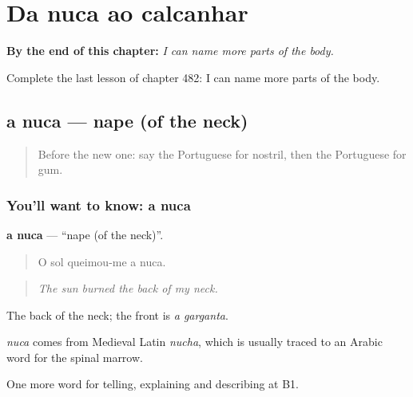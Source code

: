 
\chapter{Da nuca ao calcanhar}
\label{ch:pt-da-nuca-ao-calcanhar}

\begin{chapteropening}
\textbf{By the end of this chapter:} \emph{I can name more parts of the body.}

Complete the last lesson of chapter 482: I can name more parts of the body.
\end{chapteropening}

\section[a nuca]{a nuca — nape (of the neck)}

\label{lesson:PT-C482-nuca}



\begin{quote}
Before the new one: say the Portuguese for nostril, then the Portuguese for gum.
\end{quote}

\subsection*{You'll want to know: a nuca}
\textbf{a nuca} — \textquotedblleft{}nape (of the neck)\textquotedblright{}.

\begin{quote}
O sol queimou-me a nuca.
\end{quote}

\begin{quote}
\emph{The sun burned the back of my neck.}
\end{quote}

The back of the neck; the front is \emph{a garganta}.

\begin{cousinweb}
\emph{nuca} comes from Medieval Latin \emph{nucha}, which is usually traced to an Arabic word for the spinal marrow.
\end{cousinweb}

\begin{grammarlens}[title={What you've built}]
One more word for telling, explaining and describing at B1.
\end{grammarlens}

